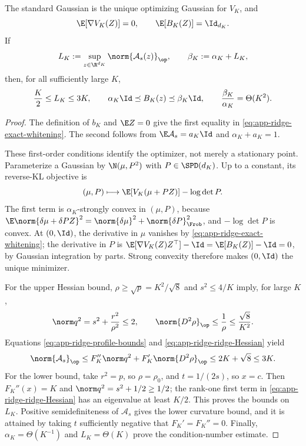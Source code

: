 \begin{lemma}
\label{lem:app-ridge-whitening-ellipticity}
The standard Gaussian is the unique optimizing Gaussian for \(V_K\), and
\begin{equation}
  \E[\nabla V_K(Z)]=0,\qquad
  \E[B_K(Z)]=\Id_{d_K}.
  \label{eq:app-ridge-exact-whitening}
\end{equation}
If
\[
  L_K:=\sup_{z\in\R^{d_K}}\norm{\mathcal A_s(z)}_{\op},
  \qquad
  \beta_K:=\alpha_K+L_K,
\]
then, for all sufficiently large \(K\),
\begin{equation}
  \frac K2\leq L_K\leq3K,\qquad
  \alpha_K\Id\preceq B_K(z)\preceq\beta_K\Id,
  \qquad
  \frac{\beta_K}{\alpha_K}=\Theta(K^2).
  \label{eq:app-ridge-ellipticity}
\end{equation}
\end{lemma}

\begin{proof}
The definition of \(b_K\) and \(\E Z=0\) give the first equality in
\eqref{eq:app-ridge-exact-whitening}.  The second follows from
\(\E\mathcal A_s=a_K\Id\) and \(\alpha_K+a_K=1\).

These first-order conditions identify the optimizer, not merely a stationary
point.  Parameterize a Gaussian by \(\N(\mu,P^2)\) with \(P\in\SPD(d_K)\).
Up to a constant, its reverse-KL objective is
\[
  (\mu,P)\longmapsto
  \E[V_K(\mu+PZ)]-\log\det P.
\]
The first term is \(\alpha_K\)-strongly convex in \((\mu,P)\), because
\(\E\norm{\delta\mu+\delta PZ}^2
=\norm{\delta\mu}^2+\norm{\delta P}_{\Frob}^2\), and
\(-\log\det P\) is convex.  At \((0,\Id)\), the derivative in \(\mu\)
vanishes by \eqref{eq:app-ridge-exact-whitening}; the derivative in \(P\)
is
\(\E[\nabla V_K(Z)Z^\top]-\Id
=\E[B_K(Z)]-\Id=0\), by Gaussian integration by parts.  Strong convexity
therefore makes \((0,\Id)\) the unique minimizer.

For the upper Hessian bound, \(\rho\geq\sqrt p=K^2/\sqrt8\) and
\(s^2\leq4/K\) imply, for large \(K\),
\[
  \norm q^2=s^2+\frac{r^2}{\rho^2}\leq2,\qquad
  \norm{D^2\rho}_{\op}\leq\frac1\rho\leq\frac{\sqrt8}{K^2}.
\]
Equations \eqref{eq:app-ridge-profile-bounds} and
\eqref{eq:app-ridge-ridge-Hessian} yield
\[
  \norm{\mathcal A_s}_{\op}
  \leq
  F_K''\norm q^2+F_K'\norm{D^2\rho}_{\op}
  \leq2K+\sqrt8\leq3K.
\]
For the lower bound, take \(r^2=p\), so \(\rho=\rho_0\), and
\(t=1/(2s)\), so \(x=c\).  Then \(F_K''(x)=K\) and
\(\norm q^2=s^2+1/2\geq1/2\); the rank-one first term in
\eqref{eq:app-ridge-ridge-Hessian} has an eigenvalue at least \(K/2\).
This proves the bounds on \(L_K\).  Positive semidefiniteness of
\(\mathcal A_s\) gives the lower curvature bound, and it is attained by
taking \(t\) sufficiently negative that \(F_K'=F_K''=0\).
Finally, \(\alpha_K=\Theta(K^{-1})\) and \(L_K=\Theta(K)\) prove the
condition-number estimate.
\end{proof}

